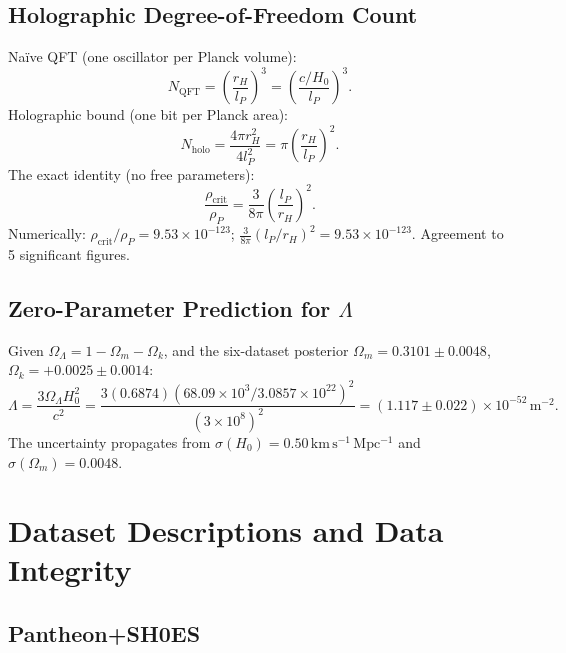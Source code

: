 \documentclass[12pt,a4paper]{article}
\newcommand{\kms}{\,\mathrm{km\,s^{-1}\,Mpc^{-1}}}
\newcommand{\OmL}{\Omega_\Lambda}
\newcommand{\Omm}{\Omega_m}
\begin{document}
\subsection{Holographic Degree-of-Freedom Count}

Naïve QFT (one oscillator per Planck volume):
\begin{equation}
N_\mathrm{QFT} = \left(\frac{r_H}{l_P}\right)^3 = \left(\frac{c/H_0}{l_P}\right)^3.
\end{equation}
Holographic bound (one bit per Planck area):
\begin{equation}
N_\mathrm{holo} = \frac{4\pi r_H^2}{4 l_P^2} = \pi\left(\frac{r_H}{l_P}\right)^2.
\end{equation}
The exact identity (no free parameters):
\begin{equation}
\frac{\rho_\mathrm{crit}}{\rho_P} = \frac{3}{8\pi}\left(\frac{l_P}{r_H}\right)^2.
\label{eq:identity}
\end{equation}
Numerically: $\rho_\mathrm{crit}/\rho_P = 9.53\times 10^{-123}$;
$\frac{3}{8\pi}(l_P/r_H)^2 = 9.53\times 10^{-123}$. Agreement to 5 significant figures.

\subsection{Zero-Parameter Prediction for $\Lambda$}

Given $\OmL = 1 - \Omm - \Omega_k$, and the six-dataset posterior
$\Omm = 0.3101 \pm 0.0048$, $\Omega_k = +0.0025 \pm 0.0014$:
\begin{equation}
\Lambda = \frac{3\OmL H_0^2}{c^2}
= \frac{3(0.6874)(68.09\times 10^3 / 3.0857\times 10^{22})^2}{(3\times 10^8)^2}
= (1.117 \pm 0.022)\times 10^{-52}\,\mathrm{m}^{-2}.
\end{equation}
The uncertainty propagates from $\sigma(H_0) = 0.50\kms$ and
$\sigma(\Omm) = 0.0048$.

\section{Dataset Descriptions and Data Integrity}
\label{sec:data}

\subsection{Pantheon+SH0ES}
\end{document}
